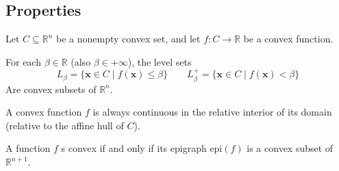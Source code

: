 \subsection{Properties}
Let $C \subseteq \mathbb{R}^n$ be a nonempty convex set, and let $f : C \rightarrow\mathbb{R}$ be a convex function. 
\begin{property}
    For each $\beta \in\mathbb{R}$ (also $\beta\in + \infty$), the level sets
    \[L_{\beta} = \{\mathbf{x} \in C \mid f (\mathbf{x}) \leq \beta\} \qquad L_{\beta}^{+} = \{\mathbf{x} \in C \mid f (\mathbf{x}) <\beta\}\]
    Are convex subsets of $\mathbb{R}^n$.
\end{property}
\begin{property}
    A convex function $f$ is always continuous in the relative interior of its domain (relative to the affine hull of $C$). 
\end{property}
\begin{property}
    A function $f$ s convex if and only if its epigraph $\text{epi}(f)$ is a convex subset of $\mathbb{R}^{n+1}$. 
\end{property}

